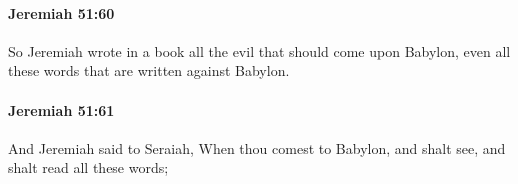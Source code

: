 		\paragraph{Jeremiah 51:60} %
			\label{JEREMIAH-51-60}

			So Jeremiah wrote in a book all the evil that should come upon Babylon, even all these words that are written against Babylon.


		\paragraph{Jeremiah 51:61} %
			\label{JEREMIAH-51-61}

			And Jeremiah said to Seraiah, When thou comest to Babylon, and shalt see, and shalt read all these words;


